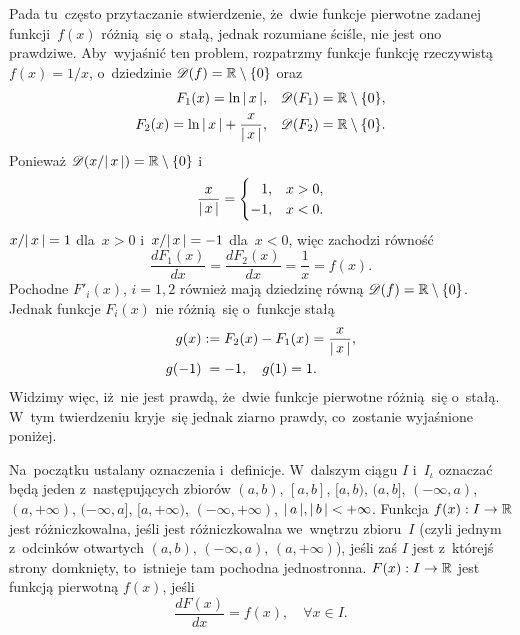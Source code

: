 \documentclass[a4paper,11pt]{article}
\begin{document}
\start {} Pada tu~często przytaczanie stwierdzenie, że~dwie
funkcje pierwotne zadanej funkcji~$f( x )$ różnią~się o~stałą, jednak
rozumiane ściśle, nie jest ono prawdziwe. Aby~wyjaśnić ten problem,
rozpatrzmy funkcje funkcję rzeczywistą $f( x ) = 1 / x$, o~dziedzinie
$\mathcal{D}( f ) = \mathbb{R} \setminus \{ 0 \}$ oraz
\begin{subequations}
  \begin{align}
    \label{eq:FichtenholzVolII-01-A}
    F_{ 1 }( x ) = \ln|\, {  x  } \,|, \quad
    & \mathcal{D}( F_{ 1 } ) = \mathbb{R} \setminus \{ 0 \}, \\
    \label{eq:FichtenholzVolII-01-B}
    F_{ 2 }( x ) = \ln|\, {  x  } \,| + \frac{ x }{ |\, {  x  } \,| }, \quad
    & \mathcal{D}( F_{ 2 } ) = \mathbb{R} \setminus \{ 0 \}.
  \end{align}
\end{subequations}
Ponieważ $\mathcal{D}( x / |\, {  x  } \,| ) = \mathbb{R} \setminus \{ 0 \}$ i
\begin{equation}
  \label{eq:FichtenholzVolII-02}
  \frac{ x }{ |\, {  x  } \,| } =
  \begin{cases}
    \hphantom{-}1, & x > 0, \\
    -1, & x < 0.
  \end{cases}
\end{equation}
$x / |\, {  x  } \,| = 1$ dla~$x > 0$ i~$x / |\, {  x  } \,| = -1$ dla~$x < 0$,
więc zachodzi równość
\begin{equation}
  \label{eq:FichtenholzVolII-03}
  \frac{ d F_{ 1 }( x ) }{ dx } = \frac{ d F_{ 2 }( x ) }{ dx }
  = \frac{ 1 }{ x } = f( x ).
\end{equation}
Pochodne $F'_{ i }( x )$, $i = 1, 2$ również mają dziedzinę równą
$\mathcal{D}( f ) = \mathbb{R} \setminus \{ 0 \}$. Jednak funkcje $F_{ i }( x )$ nie
różnią~się o~funkcje stałą
\begin{subequations}
  \begin{align}
    \label{eq:FichtenholzVolII-04-A}
    g( x ) &:= F_{ 2 }( x ) - F_{ 1 }( x ) = \frac{ x }{ |\, {  x  } \,| }, \\
    \label{eq:FichtenholzVolII-04-B}
    g( -1 ) &\hphantom{:}= -1, \quad g( 1 ) = 1.
  \end{align}
\end{subequations}
Widzimy więc, iż~nie jest prawdą, że~dwie funkcje pierwotne różnią~się
o~stałą. W~tym twierdzeniu kryje~się jednak ziarno prawdy, co~zostanie
wyjaśnione poniżej.

Na~początku ustalany oznaczenia i~definicje. W~dalszym ciągu $I$
i~$I_{ \iota }$ oznaczać będą jeden z~następujących zbiorów
$( a, b )$, $[ a, b ]$, $[ a, b )$, $( a, b ]$, $( -\infty, a )$,
$( a, +\infty )$, $( -\infty, a ]$, $[ a, +\infty )$,
$( -\infty, +\infty )$, $|\, {  a  } \,|, |\, {  b  } \,| < +\infty$. Funkcja
$f( x ): I \to \mathbb{R}$ jest różniczkowalna, jeśli jest różniczkowalna
we~wnętrzu zbioru~$I$ (czyli jednym z~odcinków otwartych $( a, b )$,
$( -\infty, a )$, $( a, +\infty )$), jeśli zaś $I$ jest z~którejś
strony domknięty, to~istnieje tam pochodna jednostronna.
$F( x ): I \to \mathbb{R}$ jest funkcją pierwotną $f( x )$, jeśli
\begin{equation}
  \label{eq:FichtenholzVolII-05}
  \frac{ d F( x ) }{ dx } = f( x ), \quad \forall x \in I.
\end{equation}
\end{document}

